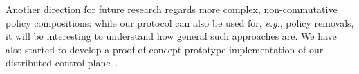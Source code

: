 \documentclass[11pt,pdftex,letter]{article}
\newcommand{\eg}{{\it e.g.}}
\begin{document}
Another direction for future research regards more complex, non-commutative policy compositions:
while our protocol can also be used for, \eg, policy removals,
it will be interesting to understand how general such approaches are.
%
We have also started to develop a proof-of-concept prototype implementation of our distributed
control plane~\cite{ons13stn}.

%





\end{document}

